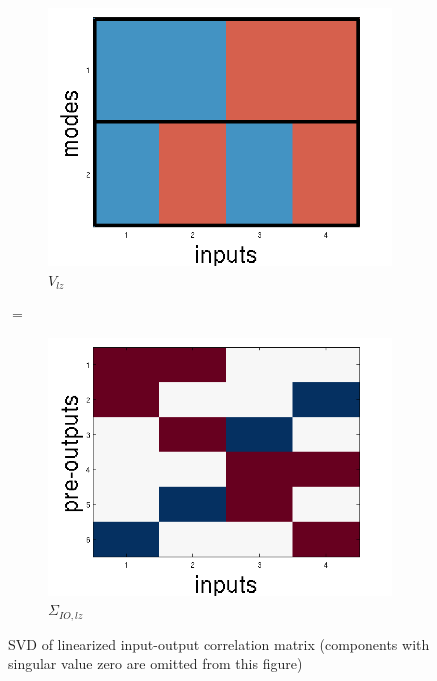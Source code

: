 \documentclass[10pt,letterpaper]{article}
\begin{document}
\begin{figure}
\begin{subfigure}{0.22\textwidth}
\includegraphics[width=\textwidth]{figures/V_lz.png}
\caption{$V_{lz}$}
\end{subfigure}
\huge{$=$}
\begin{subfigure}{0.22\textwidth}
\includegraphics[width=\textwidth]{figures/linearized_IO.png}
\caption{$\Sigma_{IO,lz}$}
\end{subfigure}
\caption{SVD of linearized input-output correlation matrix (components with singular value zero are omitted from this figure)}
\label{linearized_SVD_figure}
\end{figure}
\end{document}
